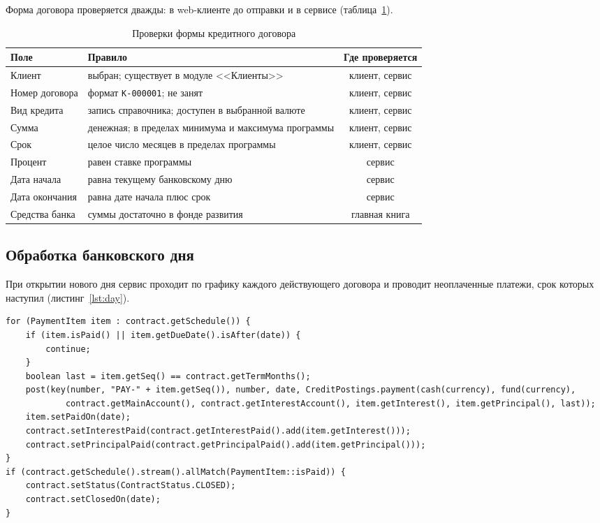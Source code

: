 \documentclass[14pt,a4paper]{extarticle}
\begin{document}
Форма договора проверяется дважды: в web-клиенте до отправки и в сервисе
(таблица~\ref{tab:checks}).

\begin{table}[H]
\caption{Проверки формы кредитного договора}
\label{tab:checks}
\centering
\small
\begin{tabularx}{\textwidth}{lXc}
\toprule
Поле & Правило & Где проверяется \\
\midrule
Клиент & выбран; существует в модуле <<Клиенты>> & клиент, сервис \\
Номер договора & формат \texttt{К-000001}; не занят & клиент, сервис \\
Вид кредита & запись справочника; доступен в выбранной валюте & клиент, сервис \\
Сумма & денежная; в пределах минимума и максимума программы & клиент, сервис \\
Срок & целое число месяцев в пределах программы & клиент, сервис \\
Процент & равен ставке программы & сервис \\
Дата начала & равна текущему банковскому дню & сервис \\
Дата окончания & равна дате начала плюс срок & сервис \\
Средства банка & суммы достаточно в фонде развития & главная книга \\
\bottomrule
\end{tabularx}
\end{table}

\subsection{Обработка банковского дня}

При открытии нового дня сервис проходит по графику каждого действующего договора и
проводит неоплаченные платежи, срок которых наступил (листинг~\ref{lst:day}).

\begin{lstlisting}[style=java, caption={Платежи по графику (\texttt{CreditService.processDay})}, label={lst:day}]
for (PaymentItem item : contract.getSchedule()) {
    if (item.isPaid() || item.getDueDate().isAfter(date)) {
        continue;
    }
    boolean last = item.getSeq() == contract.getTermMonths();
    post(key(number, "PAY-" + item.getSeq()), number, date, CreditPostings.payment(cash(currency), fund(currency),
            contract.getMainAccount(), contract.getInterestAccount(), item.getInterest(), item.getPrincipal(), last));
    item.setPaidOn(date);
    contract.setInterestPaid(contract.getInterestPaid().add(item.getInterest()));
    contract.setPrincipalPaid(contract.getPrincipalPaid().add(item.getPrincipal()));
}
if (contract.getSchedule().stream().allMatch(PaymentItem::isPaid)) {
    contract.setStatus(ContractStatus.CLOSED);
    contract.setClosedOn(date);
}
\end{lstlisting}
\end{document}
